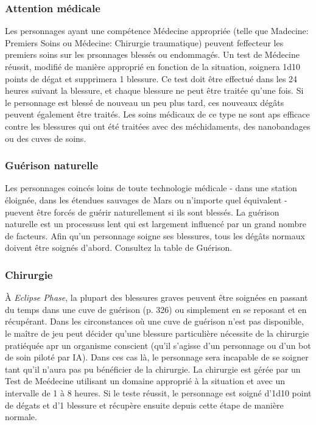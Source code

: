 \subsubsection{Attention médicale} 

Les personnages ayant une compétence Médecine appropriée (telle que Madecine: Premiers Soins ou Médecine: Chirurgie traumatique) peuvent feffecteur les premiers soins sur les prsonnages blessés ou endommagés. Un test de Médecine réussit, modifié de manière approprié en fonction de la situation, soignera 1d10 points de dégat et supprimera 1 blessure. Ce test doit être effectué dans les 24 heures suivant la blessure, et chaque blessure ne peut être traitée qu'une fois. Si le personnage est blessé de nouveau un peu plus tard, ces nouveaux dégâts peuvent également être traités. Les soins médicaux de ce type ne sont aps efficace contre les blessures qui ont été traitées avec des méchidaments, des nanobandages ou des cuves de soins. 

\subsubsection{Guérison naturelle} 

Les personnages coincés loins de toute technologie médicale - dans une station éloignée, dans les étendues sauvages de Mars ou n'importe quel équivalent - puevent être forcés de guérir naturellement si ils sont blessés. La guérison naturelle est un processuss lent qui est largement influencé par un grand nombre de facteurs. Afin qu'un personnage soigne ses blessures, tous les dégâts normaux doivent être soignés d'abord. Consultez la table de Guérison. 

\subsubsection{Chirurgie} 

À \emph{Eclipse Phase}, la plupart des blessures graves peuvent être soignées en passant du temps dans une cuve de guérison (p. 326) ou simplement en se reposant et en récupérant. Dans les circonstances où une cuve de guérison n'est pas disponible, le maître de jeu peut décider qu'une blessure particulière nécessite de la chirurgie pratiéquée apr un organisme conscient (qu'il s'agisse d'un personnage ou d'un bot de soin piloté par IA). Dans ces cas là, le personnage sera incapable de se soigner tant qu'il n'aura pas pu bénéficier de la chirurgie. La chirurgie est gérée par un Test de Meédecine utilisant un domaine approprié à la situation et avec un intervalle de 1 à 8 heures. Si le teste réussit, le personnage est soigné d'1d10 point de dégats et d'1 blessure et récupère ensuite depuis cette étape de manière normale. 

